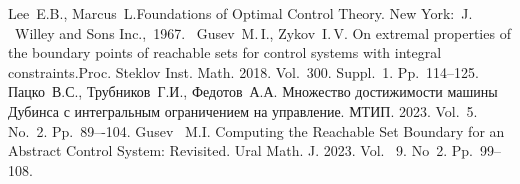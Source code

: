 \begin{thebibliography}{9} %
Lee~E.B., Marcus~L.Foundations of Optimal Control Theory.
New York:~J. ~Willey and Sons Inc.,~1967.\
Gusev~M.\,I., Zykov~I.\,V. On extremal properties of the boundary points of reachable sets for control systems with integral constraints.Proc. Steklov Inst. Math. 2018. Vol.~300. Suppl.~1. Pp.~114--125.
\bibitem{PTF23}
Пацко~В.С., Трубников~Г.И., Федотов~А.А. Множество достижимости машины Дубинса с интегральным ограничением на управление. МТИП. 2023. Vol.~5. No.~2.  Pp.~89–-104.
\bibitem{G23}
Gusev~ M.I. Computing the Reachable Set Boundary for an Abstract Control System: Revisited. Ural Math. J. 2023. Vol.~ 9. No~2. Pp.~99--108.

\end{thebibliography}





%
